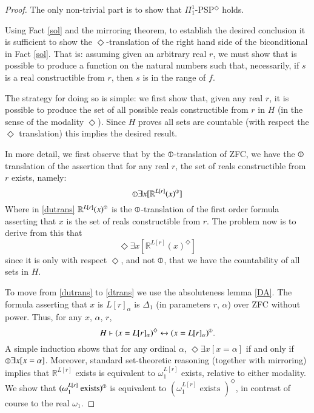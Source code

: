 \documentclass{article}
\newcommand\D{\circledbar}
\begin{document}
\begin{proof}
    The only non-trivial part is to show that $\Pi_1^1$-PSP$^\Diamond$ holds.

    Using Fact \ref{sol} and the mirroring theorem, to establish 
the desired conclusion it is sufficient to show the $\Diamond$-translation 
of the right hand side of the biconditional in Fact \ref{sol}. That is: assuming given an arbitrary real $r$, 
we must show that is possible to produce a function on the natural numbers such that, 
necessarily, if $s$ is a real constructible from $r$, 
then $s$ is in the range of $f$.

The strategy for doing so is simple: we first show that, given any real $r$, 
it is possible to produce the set of all possible reals constructible from $r$ in 
$H$ (in the sense of the modality $\Diamond$). Since $H$ proves all sets are countable (with respect the $\Diamond$ translation)
this implies the desired result.

In more detail,
we first observe that by the $\D$-translation of ZFC, 
we have the $\D$ translation of the assertion that for any real $r$, the 
set of reals constructible from $r$ exists, namely:
\begin{equation}\label{dutrans}
    \D \exists x [\mathbb{R}^{L[r]}(x)^{\D}]
\end{equation}
Where in \eqref{dutrans} $\mathbb{R}^{L[r]}(x)^{\D}$ is the $\D$-translation of the first order 
formula asserting that $x$ 
is the set of reals constructible from $r$. The problem now is to derive from this 
that 
\begin{equation}\label{dtrans}
    \Diamond \exists x [\mathbb{R}^{L[r]}(x)^{\Diamond}]
\end{equation}
since it is only with respect $\Diamond$, and not $\D$, that we have the countability 
of all sets in $H$.

To move from \eqref{dutrans} to \eqref{dtrans} we use the absoluteness 
lemma \ref{DA}. The formula asserting that $x$ is $L[r]_\alpha$ is $\Delta_1$ 
(in parameters $r$, $\alpha$) 
over ZFC without power. Thus, for any $x$, $\alpha$, $r$, 
\begin{equation}\label{butt}H \vdash (x = L[r]_\alpha)^\Diamond \leftrightarrow
(x = L[r]_\alpha)^{\D}.\end{equation}
A simple induction shows that for any ordinal $\alpha$, $\Diamond \exists x[ x = \alpha]$ if and only if 
$\D \exists x[x = \alpha]$.
Moreover, standard set-theoretic reasoning (together with mirroring) 
implies that $\mathbb{R}^{L[r]}$ exists is equivalent to $\omega_1^{L[r]}$
exists, relative to either modality. 
We show that $(\omega_1^{L[r]} \text{ exists})^{\D}$ is equivalent to 
$(\omega_1^{L[r]} \text{ exists })^\Diamond$, 
in contrast of course to the real $\omega_1$.


\end{proof}
\end{document}
